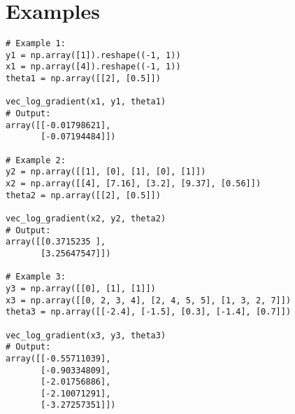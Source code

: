 \section*{Examples}
\begin{verbatim}
# Example 1:
y1 = np.array([1]).reshape((-1, 1))
x1 = np.array([4]).reshape((-1, 1))
theta1 = np.array([[2], [0.5]])

vec_log_gradient(x1, y1, theta1)
# Output:
array([[-0.01798621],
       [-0.07194484]])

# Example 2: 
y2 = np.array([[1], [0], [1], [0], [1]])
x2 = np.array([[4], [7.16], [3.2], [9.37], [0.56]])
theta2 = np.array([[2], [0.5]])

vec_log_gradient(x2, y2, theta2)
# Output:
array([[0.3715235 ],
       [3.25647547]])

# Example 3: 
y3 = np.array([[0], [1], [1]])
x3 = np.array([[0, 2, 3, 4], [2, 4, 5, 5], [1, 3, 2, 7]])
theta3 = np.array([[-2.4], [-1.5], [0.3], [-1.4], [0.7]])

vec_log_gradient(x3, y3, theta3)
# Output:
array([[-0.55711039],
       [-0.90334809],
       [-2.01756886],
       [-2.10071291],
       [-3.27257351]])
\end{verbatim}